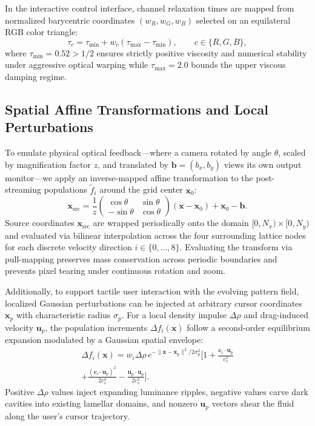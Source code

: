 \documentclass[aps,pre,twocolumn,showpacs,superscriptaddress,floatfix]{revtex4-2}
\begin{document}
In the interactive control interface, channel relaxation times are mapped from normalized barycentric coordinates $(w_R, w_G, w_B)$ selected on an equilateral RGB color triangle:
\begin{equation}
\tau_c = \tau_{\min} + w_c (\tau_{\max} - \tau_{\min}), \qquad c \in \{R, G, B\},
\label{eq:barycentric_tau}
\end{equation}
where $\tau_{\min} = 0.52 > 1/2$ ensures strictly positive viscosity and numerical stability under aggressive optical warping while $\tau_{\max} = 2.0$ bounds the upper viscous damping regime.

\subsection{Spatial Affine Transformations and Local Perturbations}

To emulate physical optical feedback—where a camera rotated by angle $\theta$, scaled by magnification factor $z$, and translated by $\bm{b} = (b_x, b_y)$ views its own output monitor—we apply an inverse-mapped affine transformation to the post-streaming populations $\tilde{f}_i$ around the grid center $\bm{x}_0$:
\begin{equation}
\bm{x}_{\mathrm{src}} = \frac{1}{z} \begin{pmatrix} \cos\theta & \sin\theta \\ -\sin\theta & \cos\theta \end{pmatrix} (\bm{x} - \bm{x}_0) + \bm{x}_0 - \bm{b}.
\label{eq:affine_inverse}
\end{equation}
Source coordinates $\bm{x}_{\mathrm{src}}$ are wrapped periodically onto the domain $[0, N_x) \times [0, N_y)$ and evaluated via bilinear interpolation across the four surrounding lattice nodes for each discrete velocity direction $i \in \{0, \dots, 8\}$. Evaluating the transform via pull-mapping preserves mass conservation across periodic boundaries and prevents pixel tearing under continuous rotation and zoom.

Additionally, to support tactile user interaction with the evolving pattern field, localized Gaussian perturbations can be injected at arbitrary cursor coordinates $\bm{x}_p$ with characteristic radius $\sigma_p$. For a local density impulse $\Delta \rho$ and drag-induced velocity $\bm{u}_p$, the population increments $\Delta f_i(\bm{x})$ follow a second-order equilibrium expansion modulated by a Gaussian spatial envelope:
\begin{multline}
\Delta f_i(\bm{x}) = w_i \Delta \rho \, e^{-\|\bm{x} - \bm{x}_p\|^2 / 2\sigma_p^2} \Bigg[ 1 + \frac{\bm{c}_i \cdot \bm{u}_p}{c_s^2} \\
+ \frac{(\bm{c}_i \cdot \bm{u}_p)^2}{2c_s^4} - \frac{\bm{u}_p \cdot \bm{u}_p}{2c_s^2} \Bigg].
\label{eq:local_perturbation}
\end{multline}
Positive $\Delta \rho$ values inject expanding luminance ripples, negative values carve dark cavities into existing lamellar domains, and nonzero $\bm{u}_p$ vectors shear the fluid along the user's cursor trajectory.
\end{document}
